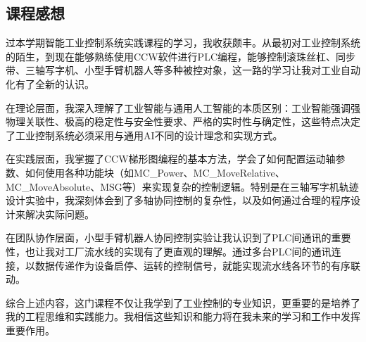 \documentclass{article}
\begin{document}
\subsection{课程感想}
过本学期智能工业控制系统实践课程的学习，我收获颇丰。从最初对工业控制系统的陌生，到现在能够熟练使用CCW软件进行PLC编程，能够控制滚珠丝杠、同步带、三轴写字机、小型手臂机器人等多种被控对象，这一路的学习让我对工业自动化有了全新的认识。\par
在理论层面，我深入理解了工业智能与通用人工智能的本质区别：工业智能强调强物理关联性、极高的稳定性与安全性要求、严格的实时性与确定性，这些特点决定了工业控制系统必须采用与通用AI不同的设计理念和实现方式。\par
在实践层面，我掌握了CCW梯形图编程的基本方法，学会了如何配置运动轴参数、如何使用各种功能块（如MC\_Power、MC\_MoveRelative、MC\_MoveAbsolute、MSG等）来实现复杂的控制逻辑。特别是在三轴写字机轨迹设计实验中，我深刻体会到了多轴协同控制的复杂性，以及如何通过合理的程序设计来解决实际问题。\par
在团队协作层面，小型手臂机器人协同控制实验让我认识到了PLC间通讯的重要性，也让我对工厂流水线的实现有了更直观的理解。通过多台PLC间的通讯连接，以数据传递作为设备启停、运转的控制信号，就能实现流水线各环节的有序联动。\par
综合上述内容，这门课程不仅让我学到了工业控制的专业知识，更重要的是培养了我的工程思维和实践能力。我相信这些知识和能力将在我未来的学习和工作中发挥重要作用。
\end{document}
